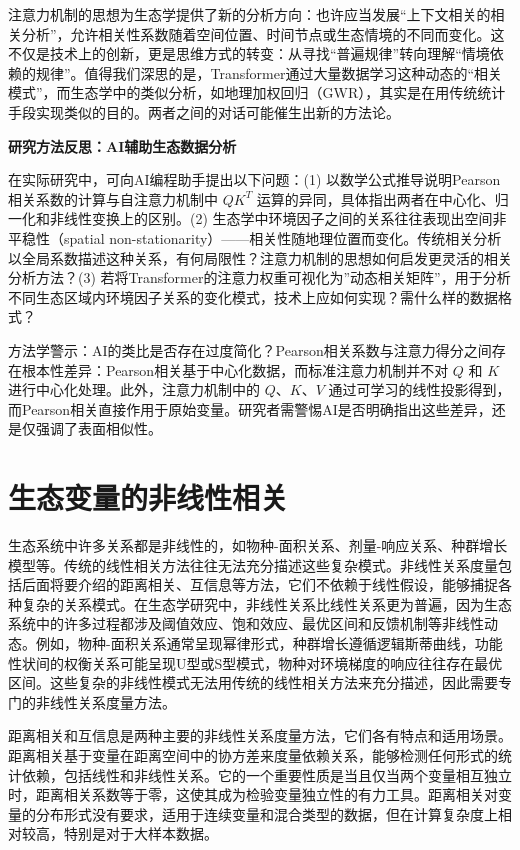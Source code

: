 \documentclass[
  twoside,12pt,fontset=none]{ctexbook}
\renewenvironment{quote}{%
  \def\FrameCommand{{\color{quote-border}\vrule width 4pt}\hspace{10pt}}%
  \MakeFramed {\advance\hsize-\width \FrameRestore\noindent\ignorespaces}%
}{%
  \endMakeFramed
}
\begin{document}
注意力机制的思想为生态学提供了新的分析方向：也许应当发展``上下文相关的相关分析''，允许相关性系数随着空间位置、时间节点或生态情境的不同而变化。这不仅是技术上的创新，更是思维方式的转变：从寻找``普遍规律''转向理解``情境依赖的规律''。值得我们深思的是，Transformer通过大量数据学习这种动态的``相关模式''，而生态学中的类似分析，如地理加权回归（GWR），其实是在用传统统计手段实现类似的目的。两者之间的对话可能催生出新的方法论。

\begin{quote}
\textbf{研究方法反思：AI辅助生态数据分析}

在实际研究中，可向AI编程助手提出以下问题：(1) 以数学公式推导说明Pearson相关系数的计算与自注意力机制中 \(QK^T\) 运算的异同，具体指出两者在中心化、归一化和非线性变换上的区别。(2) 生态学中环境因子之间的关系往往表现出空间非平稳性（spatial non-stationarity）------相关性随地理位置而变化。传统相关分析以全局系数描述这种关系，有何局限性？注意力机制的思想如何启发更灵活的相关分析方法？(3) 若将Transformer的注意力权重可视化为''动态相关矩阵''，用于分析不同生态区域内环境因子关系的变化模式，技术上应如何实现？需什么样的数据格式？

方法学警示：AI的类比是否存在过度简化？Pearson相关系数与注意力得分之间存在根本性差异：Pearson相关基于中心化数据，而标准注意力机制并不对 \(Q\) 和 \(K\) 进行中心化处理。此外，注意力机制中的 \(Q\)、\(K\)、\(V\) 通过可学习的线性投影得到，而Pearson相关直接作用于原始变量。研究者需警惕AI是否明确指出这些差异，还是仅强调了表面相似性。
\end{quote}

\hypertarget{ux751fux6001ux53d8ux91cfux7684ux975eux7ebfux6027ux76f8ux5173}{%
\section{生态变量的非线性相关}\label{ux751fux6001ux53d8ux91cfux7684ux975eux7ebfux6027ux76f8ux5173}}

生态系统中许多关系都是非线性的，如物种-面积关系、剂量-响应关系、种群增长模型等。传统的线性相关方法往往无法充分描述这些复杂模式。非线性关系度量包括后面将要介绍的距离相关、互信息等方法，它们不依赖于线性假设，能够捕捉各种复杂的关系模式。在生态学研究中，非线性关系比线性关系更为普遍，因为生态系统中的许多过程都涉及阈值效应、饱和效应、最优区间和反馈机制等非线性动态。例如，物种-面积关系通常呈现幂律形式，种群增长遵循逻辑斯蒂曲线，功能性状间的权衡关系可能呈现U型或S型模式，物种对环境梯度的响应往往存在最优区间。这些复杂的非线性模式无法用传统的线性相关方法来充分描述，因此需要专门的非线性关系度量方法。

距离相关和互信息是两种主要的非线性关系度量方法，它们各有特点和适用场景。距离相关基于变量在距离空间中的协方差来度量依赖关系，能够检测任何形式的统计依赖，包括线性和非线性关系。它的一个重要性质是当且仅当两个变量相互独立时，距离相关系数等于零，这使其成为检验变量独立性的有力工具。距离相关对变量的分布形式没有要求，适用于连续变量和混合类型的数据，但在计算复杂度上相对较高，特别是对于大样本数据。
\end{document}
